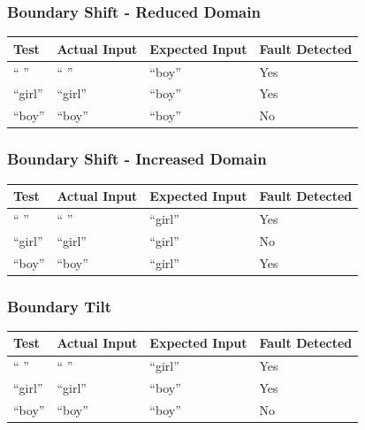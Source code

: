 \documentclass[11pt, oneside]{article}   	%
\begin{document}
\subsubsection{Boundary Shift - Reduced Domain}
\begin{table}[!htb]
\centering
\begin{tabular}{|l|l|l|l|}
\hline
Test   & Actual Input & Expected Input & Fault Detected \\ \hline
“ ”    & “ ”          & “boy”          & Yes            \\ \hline
“girl” & “girl”       & “boy”          & Yes            \\ \hline
“boy”  & “boy”        & “boy”          & No             \\ \hline
\end{tabular}
\end{table}

\subsubsection{Boundary Shift - Increased Domain}
\begin{table}[!htb]
\centering
\begin{tabular}{|l|l|l|l|}
\hline
Test   & Actual Input & Expected Input & Fault Detected \\ \hline
“ ”    & “ ”          & “girl”         & Yes            \\ \hline
“girl” & “girl”       & “girl”         & No             \\ \hline
“boy”  & “boy”        & “girl”         & Yes            \\ \hline
\end{tabular}
\end{table}

\subsubsection{Boundary Tilt}
\begin{table}[!htb]
\centering
\begin{tabular}{|l|l|l|l|}
\hline
Test   & Actual Input & Expected Input & Fault Detected \\ \hline
“ ”    & “ ”          & “girl”         & Yes            \\ \hline
“girl” & “girl”       & “boy”          & Yes            \\ \hline
“boy”  & “boy”        & “boy”          & No             \\ \hline
\end{tabular}
\end{table}
\end{document}
